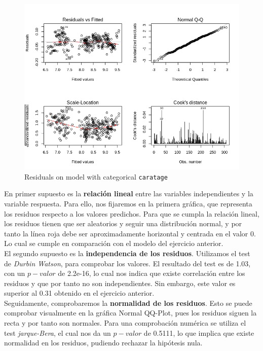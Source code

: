 \documentclass[a4paper, 9pt]{article}
\begin{document}
\begin{figure}[h!]
    \centering
    \includegraphics[scale=0.5]{report/images/question-3/question-1.png}
    \caption{Residuals on model with categorical \texttt{caratage}}
    \label{fig:my_label}
\end{figure}

En primer supuesto es la \textbf{relación lineal} entre las variables independientes y la variable respuesta. Para ello, nos fijaremos en la primera gráfica, que representa los residuos respecto a los valores predichos. Para que se cumpla la relación lineal, los residuos tienen que ser aleatorios y seguir una distribución normal, y por tanto la línea roja debe ser aproximadamente horizontal y centrada en el valor 0. Lo cual se cumple en comparación con el modelo del ejercicio anterior. \\

El segundo supuesto es la \textbf{independencia de los residuos}. Utilizamos el test de \textit{Durbin Watson}, para comprobar los valores. El resultado del test es de 1.03, con un $p-valor$ de 2.2e-16, lo cual nos indica que existe correlación entre los residuos y que por tanto no son independientes. Sin embargo, este valor es superior al 0.31 obtenido en el ejercicio anterior. \\

Seguidamente, comprobaremos la \textbf{normalidad de los residuos}. Esto se puede comprobar visualmente en la gráfica Normal QQ-Plot, pues los residuos siguen la recta y por tanto son normales. Para una comprobación numérica se utiliza el test \textit{jarque-Bera}, el cual nos da un $p-valor$ de 0.5111, lo que implica que existe normalidad en los residuos, pudiendo rechazar la hipótesis nula. \\
\end{document}
